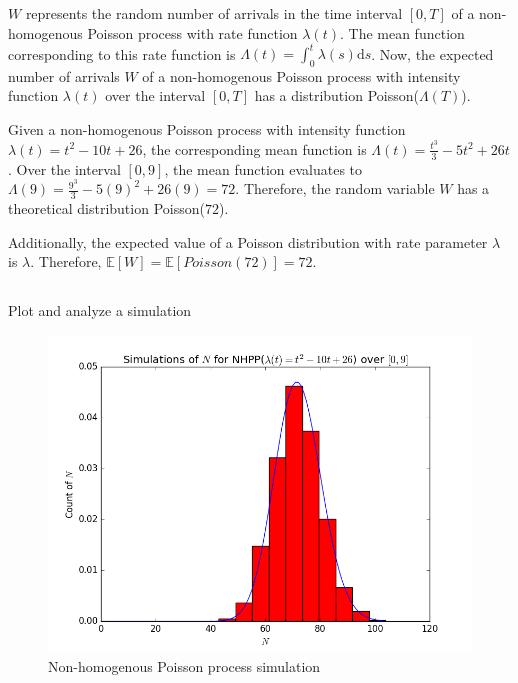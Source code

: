 \documentclass[11pt, oneside]{article}   	%
\begin{document}
\subsection{}
$W$ represents the random number of arrivals in the time interval $[0, T]$ of a non-homogenous Poisson process with rate function $\lambda(t)$. The mean function corresponding to this rate function is $\Lambda(t) = \int_{0}^{t}\lambda(s)\mathrm{d}s $. Now, the expected number of arrivals $W$ of a non-homogenous Poisson process with intensity function $\lambda(t)$ over the interval $[0, T]$ has a distribution Poisson($\Lambda(T)$). 

Given a non-homogenous Poisson process with intensity function $\lambda(t)=t^2-10t+26$, the corresponding mean function is $\Lambda(t)=\frac{t^3}{3}-5t^2+26t$. Over the interval $[0,9]$, the mean function evaluates to $\Lambda(9)=\frac{9^3}{3} - 5(9)^2+26(9) = 72$. Therefore, the random variable $W$ has a theoretical distribution Poisson($72$).

Additionally, the expected value of a Poisson distribution with rate parameter $\lambda$ is $\lambda$. Therefore, $\mathbb{E}[W]=\mathbb{E}[Poisson(72)]=72$.

\subsection{}
Plot and analyze a simulation
\begin{figure}[H]
\includegraphics[scale=.5]{nhpp_n}
\caption{Non-homogenous Poisson process simulation}
\label{fig:x}
\end{figure}
\end{document}
